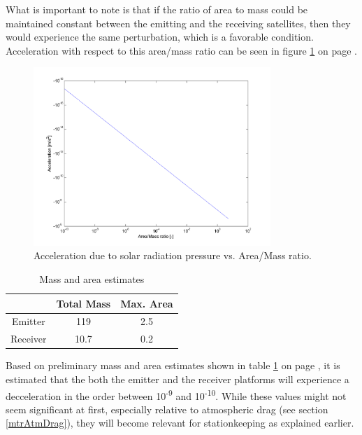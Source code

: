 What is important to note is that if the ratio of area to mass could be maintained constant between the emitting and the receiving satellites, then they would experience the same perturbation, which is a favorable condition. Acceleration with respect to this area/mass ratio can be seen in figure \ref{fig:solarRadRatio} on page \pageref{fig:solarRadRatio}.

\begin{figure}[h!]
\centering
\includegraphics[width=0.8\textwidth, angle=0]{chapters/img/solPressureVarRatio.png}
\caption{Acceleration due to solar radiation pressure vs. Area/Mass ratio.}
\label{fig:solarRadRatio}
\end{figure}

\begin{table}[h]
	\centering
		\begin{tabular}{c|c|c}
		 & Total Mass & Max. Area \\ \hline \hline
		 Emitter & 119 & 2.5 \\ 
		 Receiver & 10.7 & 0.2 
			
		\end{tabular}
	\caption{Mass and area estimates}
	\label{table:solarEstimates}
\end{table}

Based on preliminary mass and area estimates shown in table \ref{table:solarEstimates} on page \pageref{table:solarEstimates}, it is estimated that the both the emitter and the receiver platforms will experience a decceleration in the order between 10\textsuperscript{-9} and 10\textsuperscript{-10}. While these values might not seem significant at first, especially relative to atmospheric drag (see section \ref{mtrAtmDrag}), they will become relevant for stationkeeping as explained earlier.

